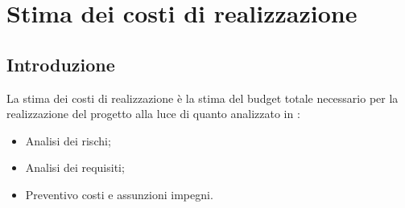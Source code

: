 \documentclass{article}
\begin{document}
\section{Stima dei costi di realizzazione}
\subsection{Introduzione}
La stima dei costi di realizzazione è la stima del budget totale necessario per la realizzazione del progetto alla luce di quanto analizzato in :
\begin{itemize}
    \item Analisi dei rischi;
    \item Analisi dei requisiti;
    \item Preventivo costi e assunzioni impegni.
\end{itemize}
\end{document}

